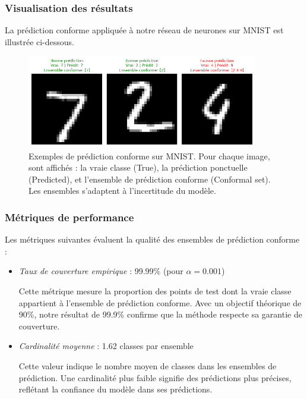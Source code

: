 \documentclass[a4paper,12pt]{article}
\begin{document}
\subsubsection{Visualisation des résultats}

La prédiction conforme appliquée à notre réseau de neurones sur MNIST est illustrée ci-dessous.

\begin{figure}[h]
\centering
\includegraphics[width=0.9\textwidth]{conformal_prediction_classification.png}
\caption{Exemples de prédiction conforme sur MNIST. Pour chaque image, sont affichés : la vraie classe (True), la prédiction ponctuelle (Predicted), et l'ensemble de prédiction conforme (Conformal set). Les ensembles s'adaptent à l'incertitude du modèle.}
\label{fig:mnist_conforme}
\end{figure}

\subsubsection{Métriques de performance}

Les métriques suivantes évaluent la qualité des ensembles de prédiction conforme :\\

\begin{itemize}
\item \textit{Taux de couverture empirique} : 99.99\% (pour $\alpha = 0.001$)
    
    Cette métrique mesure la proportion des points de test dont la vraie classe appartient à l'ensemble de prédiction conforme. Avec un objectif théorique de 90\%, notre résultat de 99.9\% confirme que la méthode respecte sa garantie de couverture.\\

\item \textit{Cardinalité moyenne} : 1.62 classes par ensemble
    
    Cette valeur indique le nombre moyen de classes dans les ensembles de prédiction. Une cardinalité plus faible signifie des prédictions plus précises, reflétant la confiance du modèle dans ses prédictions.\\


\end{itemize}
\end{document}

